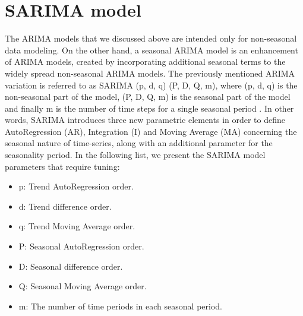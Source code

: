 \section{SARIMA model}
The ARIMA models that we discussed above are intended only for non-seasonal data modeling. On the other hand, a seasonal ARIMA model is an enhancement of ARIMA models, created by incorporating additional seasonal terms to the widely spread non-seasonal ARIMA models. The previously mentioned ARIMA variation is referred to as SARIMA (p, d, q) (P, D, Q, m), where (p, d, q) is the non-seasonal part of the model, (P, D, Q, m) is the seasonal part of the model and finally m is the number of time steps for a single seasonal period \cite{bouzerdoum2013hybrid}. In other words, SARIMA introduces three new parametric elements in order to define AutoRegression (AR), Integration (I) and Moving Average (MA) concerning the seasonal nature of time-series, along with an additional parameter for the seasonality period.
In the following list, we present the SARIMA model parameters that require tuning:
\begin{itemize}
    \item p: Trend AutoRegression order.
    \item d: Trend difference order.
    \item q: Trend Moving Average order.
    \item P: Seasonal AutoRegression order.
    \item D: Seasonal difference order.
    \item Q: Seasonal Moving Average order.
    \item m: The number of time periods in each seasonal period.
\end{itemize}
